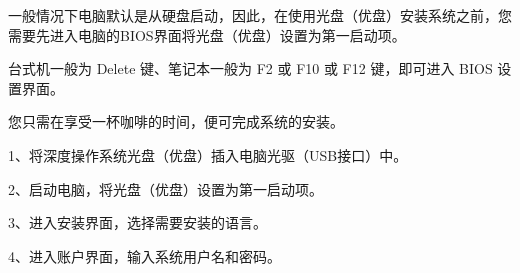 \documentclass[doctor,openright,twoside]{sjtuthesis}
\theoremstyle{plain}
\theoremstyle{definition}
\theoremstyle{remark}
\theoremstyle{ocrenumbox}
\theoremstyle{plain}
\begin{document}
一般情况下电脑默认是从硬盘启动，因此，在使用光盘（优盘）安装系统之前，您需要先进入电脑的BIOS界面将光盘（优盘）设置为第一启动项。

台式机一般为 Delete 键、笔记本一般为 F2 或 F10 或 F12 键，即可进入 BIOS 设置界面。

您只需在享受一杯咖啡的时间，便可完成系统的安装。

1、将深度操作系统光盘（优盘）插入电脑光驱（USB接口）中。

2、启动电脑，将光盘（优盘）设置为第一启动项。

3、进入安装界面，选择需要安装的语言。


4、进入账户界面，输入系统用户名和密码。

\end{document}
